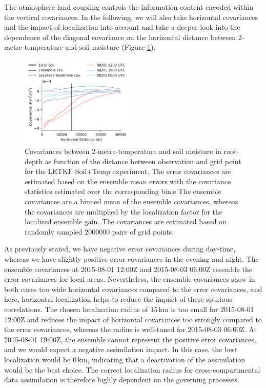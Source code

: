 \documentclass[hess, manuscript]{copernicus}
\begin{document}
The atmosphere-land coupling controls the information content encoded within the vertical covariances.
In the following, we will also take horizontal covariances and the impact of localization into account and take a deeper look into the dependence of the diagonal covariance on the horizontal distance between 2-metre-temperature and soil moisture (Figure \ref{fig:covariance_dist}).

\begin{figure}[ht]
	\includegraphics[width=0.48\textwidth]{figures/fig_11_covariance_dist.png}
	\caption{
		Covariances between 2-metre-temperature and soil moisture in root-depth as function of the distance between observation and grid point for the LETKF Soil+Temp experiment.
		The error covariances are estimated based on the ensemble mean errors with the covariance statistics estimated over the corresponding bin.s
		The ensemble covariances are a binned mean of the ensemble covariances, whereas the covariances are multiplied by the localization factor for the localized ensemble gain.
		The covariances are estimated based on randomly sampled $2000000$ pairs of grid points.
	}
	\label{fig:covariance_dist}
\end{figure}

As previously stated, we have negative error covariances during day-time, whereas we have slightly positive error covariances in the evening and night.
The ensemble covariances at 2015-08-01 12:00Z and 2015-08-03 06:00Z resemble the error covariances for local areas.
Nevertheless, the ensemble covariances show in both cases too wide horizontal covariances compared to the error covariances, and here, horizontal localization helps to reduce the impact of these spurious correlations.
The chosen localization radius of $15\,\text{km}$ is too small for 2015-08-01 12:00Z and reduces the impact of horizontal covariances too strongly compared to the error covariances, whereas the radius is well-tuned for 2015-08-03 06:00Z.
At 2015-08-01 19:00Z, the ensemble cannot represent the positive error covariances, and we would expect a negative assimilation impact.
In this case, the best localization would be $0\,\text{km}$, indicating that a deactivation of the assimilation would be the best choice.
The correct localization radius for cross-compartmental data assimilation is therefore highly dependent on the governing processes.
\end{document}
